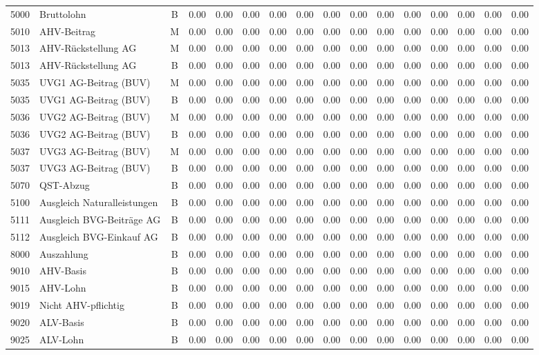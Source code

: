\documentclass[8pt,a4paper]{extarticle}
\begin{document}
\begin{longtable}{@{\extracolsep{\fill}} l l c r r r r r r r r r r r r r}
5000&Bruttolohn&B&0.00&0.00&0.00&0.00&0.00&0.00&0.00&0.00&0.00&0.00&0.00&0.00&0.00\\
5010&AHV-Beitrag&M&0.00&0.00&0.00&0.00&0.00&0.00&0.00&0.00&0.00&0.00&0.00&0.00&0.00\\
5013&AHV-Rückstellung AG&M&0.00&0.00&0.00&0.00&0.00&0.00&0.00&0.00&0.00&0.00&0.00&0.00&0.00\\
5013&AHV-Rückstellung AG&B&0.00&0.00&0.00&0.00&0.00&0.00&0.00&0.00&0.00&0.00&0.00&0.00&0.00\\
5035&UVG1 AG-Beitrag (BUV)&M&0.00&0.00&0.00&0.00&0.00&0.00&0.00&0.00&0.00&0.00&0.00&0.00&0.00\\
5035&UVG1 AG-Beitrag (BUV)&B&0.00&0.00&0.00&0.00&0.00&0.00&0.00&0.00&0.00&0.00&0.00&0.00&0.00\\
5036&UVG2 AG-Beitrag (BUV)&M&0.00&0.00&0.00&0.00&0.00&0.00&0.00&0.00&0.00&0.00&0.00&0.00&0.00\\
5036&UVG2 AG-Beitrag (BUV)&B&0.00&0.00&0.00&0.00&0.00&0.00&0.00&0.00&0.00&0.00&0.00&0.00&0.00\\
5037&UVG3 AG-Beitrag (BUV)&M&0.00&0.00&0.00&0.00&0.00&0.00&0.00&0.00&0.00&0.00&0.00&0.00&0.00\\
5037&UVG3 AG-Beitrag (BUV)&B&0.00&0.00&0.00&0.00&0.00&0.00&0.00&0.00&0.00&0.00&0.00&0.00&0.00\\
5070&QST-Abzug&B&0.00&0.00&0.00&0.00&0.00&0.00&0.00&0.00&0.00&0.00&0.00&0.00&0.00\\
5100&Ausgleich Naturalleistungen&B&0.00&0.00&0.00&0.00&0.00&0.00&0.00&0.00&0.00&0.00&0.00&0.00&0.00\\
5111&Ausgleich BVG-Beiträge AG&B&0.00&0.00&0.00&0.00&0.00&0.00&0.00&0.00&0.00&0.00&0.00&0.00&0.00\\
5112&Ausgleich BVG-Einkauf AG&B&0.00&0.00&0.00&0.00&0.00&0.00&0.00&0.00&0.00&0.00&0.00&0.00&0.00\\
8000&Auszahlung&B&0.00&0.00&0.00&0.00&0.00&0.00&0.00&0.00&0.00&0.00&0.00&0.00&0.00\\
9010&AHV-Basis&B&0.00&0.00&0.00&0.00&0.00&0.00&0.00&0.00&0.00&0.00&0.00&0.00&0.00\\
9015&AHV-Lohn&B&0.00&0.00&0.00&0.00&0.00&0.00&0.00&0.00&0.00&0.00&0.00&0.00&0.00\\
9019&Nicht AHV-pflichtig&B&0.00&0.00&0.00&0.00&0.00&0.00&0.00&0.00&0.00&0.00&0.00&0.00&0.00\\
9020&ALV-Basis&B&0.00&0.00&0.00&0.00&0.00&0.00&0.00&0.00&0.00&0.00&0.00&0.00&0.00\\
9025&ALV-Lohn&B&0.00&0.00&0.00&0.00&0.00&0.00&0.00&0.00&0.00&0.00&0.00&0.00&0.00\\

\end{longtable}
\end{document}
